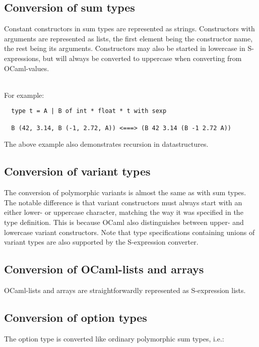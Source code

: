 \documentclass[a4paper]{article}
\begin{document}
\subsection{Conversion of sum types}

Constant constructors in sum types are represented as strings.
Constructors with arguments are represented as lists, the first element
being the constructor name, the rest being its arguments.  Constructors
may also be started in lowercase in S-expressions, but will always be
converted to uppercase when converting from OCaml-values.\\
\\
{\samepage
\noindent For example:

\begin{verbatim}
  type t = A | B of int * float * t with sexp

  B (42, 3.14, B (-1, 2.72, A)) <===> (B 42 3.14 (B -1 2.72 A))
\end{verbatim}

\noindent The above example also demonstrates recursion in datastructures.
}

\subsection{Conversion of variant types}

The conversion of polymorphic variants is almost the same as with
sum types.  The notable difference is that variant constructors must
always start with an either lower- or uppercase character, matching
the way it was specified in the type definition.  This is because OCaml
also distinguishes between upper- and lowercase variant constructors.
Note that type specifications containing unions of variant types are
also supported by the S-expression converter.

\subsection{Conversion of OCaml-lists and arrays}

OCaml-lists and arrays are straightforwardly represented as S-expression
lists.

\subsection{Conversion of option types}

The option type is converted like ordinary polymorphic sum types, i.e.:
\end{document}
